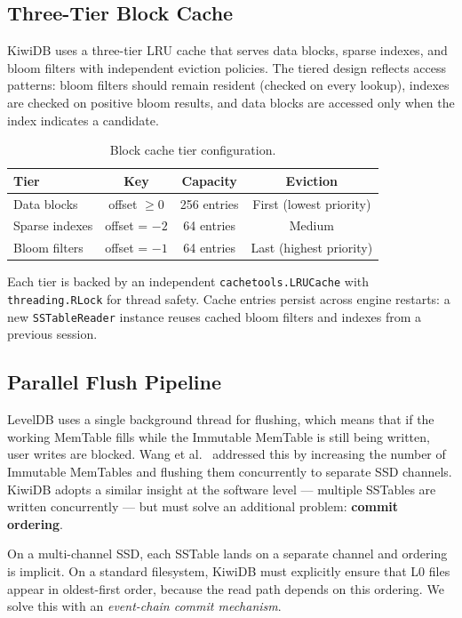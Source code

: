 \documentclass[conference]{IEEEtran}
\begin{document}
\subsection{Three-Tier Block Cache}

KiwiDB uses a three-tier LRU cache that serves data blocks, sparse indexes, and bloom filters with independent eviction policies. The tiered design reflects access patterns: bloom filters should remain resident (checked on every lookup), indexes are checked on positive bloom results, and data blocks are accessed only when the index indicates a candidate.

\begin{table}[t]
\centering
\caption{Block cache tier configuration.}
\label{tab:cache}
\begin{tabular}{@{}lccc@{}}
\toprule
\textbf{Tier} & \textbf{Key} & \textbf{Capacity} & \textbf{Eviction} \\
\midrule
Data blocks & offset $\geq 0$ & 256 entries & First (lowest priority) \\
Sparse indexes & offset = $-2$ & 64 entries & Medium \\
Bloom filters & offset = $-1$ & 64 entries & Last (highest priority) \\
\bottomrule
\end{tabular}
\end{table}

Each tier is backed by an independent \texttt{cachetools.LRUCache} with \texttt{threading.RLock} for thread safety. Cache entries persist across engine restarts: a new \texttt{SSTableReader} instance reuses cached bloom filters and indexes from a previous session.

\subsection{Parallel Flush Pipeline}
\label{sec:flush}

LevelDB uses a single background thread for flushing, which means that if the working MemTable fills while the Immutable MemTable is still being written, user writes are blocked. Wang et al.~\cite{wang2014locs} addressed this by increasing the number of Immutable MemTables and flushing them concurrently to separate SSD channels. KiwiDB adopts a similar insight at the software level --- multiple SSTables are written concurrently --- but must solve an additional problem: \textbf{commit ordering}.

On a multi-channel SSD, each SSTable lands on a separate channel and ordering is implicit. On a standard filesystem, KiwiDB must explicitly ensure that L0 files appear in oldest-first order, because the read path depends on this ordering. We solve this with an \textit{event-chain commit mechanism}.
\end{document}
